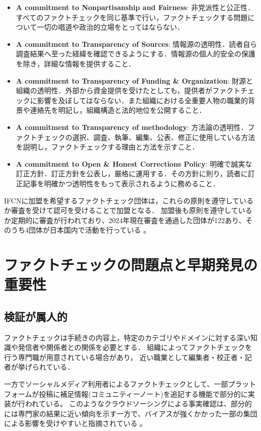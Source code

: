 \begin{itemize}
    \item \textbf{A commitment to Nonpartisanship and Fairness}: 非党派性と公正性．すべてのファクトチェックを同じ基準で行い，ファクトチェックする問題について一切の唱道や政治的立場をとってはならない．
    \item \textbf{A commitment to Transparency of Sources}: 情報源の透明性．読者自ら調査結果へ至った経緯を確認できるようにする．情報源の個人的安全の保護を除き，詳細な情報を提供すること．
    \item \textbf{A commitment to Transparency of Funding \& Organization}: 財源と組織の透明性．外部から資金提供を受けたとしても，提供者がファクトチェックに影響を及ぼしてはならない．また組織における全重要人物の職業的背景や連絡先を明記し，組織構造と法的地位を公開すること．
    \item \textbf{A commitment to Transparency of methodology}: 方法論の透明性．ファクトチェックの選択、調査、執筆、編集、公表、修正に使用している方法を説明し，ファクトチェックする理由と方法を示すこと．
    \item \textbf{A commitment to Open \& Honest Corrections Policy}: 明確で誠実な訂正方針．訂正方針を公表し，厳格に運用する．その方針に則り，読者に訂正記事を明確かつ透明性をもって表示されるように務めること．
\end{itemize}

IFCNに加盟を希望するファクトチェック団体は，これらの原則を遵守しているか審査を受けて認可を受けることで加盟となる．
加盟後も原則を遵守しているか定期的に審査が行われており、2024年現在審査を通過した団体が122あり、そのうち4団体が日本国内で活動を行っている \cite{IFCNCoP}。



\section{ファクトチェックの問題点と早期発見の重要性}
\subsection{検証が属人的}
ファクトチェックは手続きの内容上，特定のカテゴリやドメインに対する深い知識や発信者や関係者との関係を必要とする．
組織によってファクトチェックを行う専門職が用意されている場合があり，
近い職業として編集者・校正者・記者が挙げられている\cite{deahl_2019}．

一方でソーシャルメディア利用者によるファクトチェックとして、一部プラットフォームが投稿に補足情報(コミュニティーノート)を追記する機能で部分的に実装が行われている。
このようなクラウドソーシングによる事実確認は、部分的には専門家の結果に近い傾向を示す一方で、バイアスが強くかかった一部の集団による影響を受けやすいと指摘されている \cite{10.1145/3511808.3557279}。


